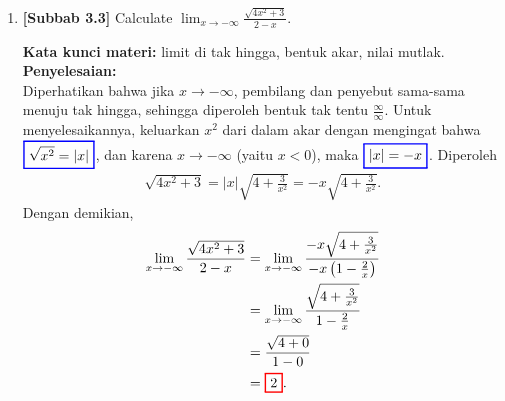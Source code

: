 \documentclass[10pt,openany,a4paper]{article}
\theoremstyle{definition}
\theoremstyle{definition}
\theoremstyle{plain}
\newenvironment{jawab}[2][tes]{%
\par\noindent\textbf{Kata kunci materi:} #1.\\
\textbf{Penyelesaian:} #2%
}{}
\begin{document}
\begin{enumerate}
    \item \textbf{[Subbab 3.3]} Calculate $\displaystyle\lim_{x\to-\infty}\frac{\sqrt{4x^2+3}}{2-x}$.
    \begin{jawab}[limit di tak hingga, bentuk akar, nilai mutlak]{~\\
        Diperhatikan bahwa jika $x\to-\infty$, pembilang dan penyebut sama-sama menuju tak hingga, sehingga diperoleh bentuk tak tentu $\frac{\infty}{\infty}$. Untuk menyelesaikannya, keluarkan $x^2$ dari dalam akar dengan mengingat bahwa $\colorlet{oldcolor}{.}
        \color{blue}
        \setlength{\fboxrule}{1pt} \boxed{\color{oldcolor}\sqrt{x^2}=|x|}\color{oldcolor}$, dan karena $x\to-\infty$ (yaitu $x<0$), maka $\colorlet{oldcolor}{.}
        \color{blue}
        \setlength{\fboxrule}{1pt} \boxed{\color{oldcolor}|x|=-x}\color{oldcolor}$. Diperoleh
        \begin{align*}
            \sqrt{4x^2+3} = |x|\sqrt{4+\frac{3}{x^2}} = -x\sqrt{4+\frac{3}{x^2}}.
        \end{align*}
        Dengan demikian,
        \begin{align*}
            \lim_{x\to-\infty}\frac{\sqrt{4x^2+3}}{2-x} &= \lim_{x\to-\infty}\frac{-x\sqrt{4+\frac{3}{x^2}}}{-x\left(1-\frac{2}{x}\right)}\\
            &= \lim_{x\to-\infty}\frac{\sqrt{4+\frac{3}{x^2}}}{1-\frac{2}{x}}\\
            &= \frac{\sqrt{4+0}}{1-0}\\
            &= \colorlet{oldcolor}{.}
        \color{red}
        \setlength{\fboxrule}{1pt} \boxed{\color{oldcolor}2}\color{oldcolor}.
        \end{align*}
    }
    \end{jawab}


\end{enumerate}
\end{document}
